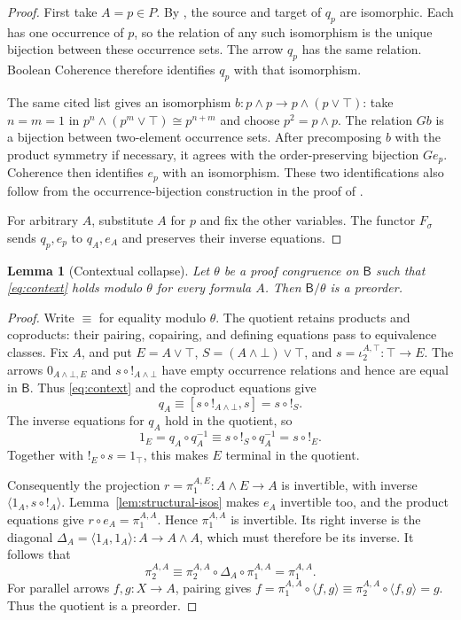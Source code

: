\documentclass[11pt]{article}
\newtheorem{lemma}[theorem]{Lemma}
\newcommand{\B}{\mathsf B}
\begin{document}
\begin{proof}
First take $A=p\in P$. By \cite[\S12.5, p.~294]{DP}, the source
and target of $q_p$ are isomorphic. Each has one occurrence of $p$,
so the relation of any such isomorphism is the unique bijection
between these occurrence sets. The arrow $q_p$ has the same relation.
Boolean Coherence therefore identifies $q_p$ with that isomorphism.

The same cited list gives an isomorphism
$b:p\wedge p\to p\wedge(p\vee\top)$: take $n=m=1$ in
$p^n\wedge(p^m\vee\top)\cong p^{n+m}$ and choose $p^2=p\wedge p$.
The relation $Gb$ is a bijection between two-element occurrence sets.
After precomposing $b$ with the product symmetry if necessary, it
agrees with the order-preserving bijection $Ge_p$. Coherence then
identifies $e_p$ with an isomorphism. These two identifications also
follow from the occurrence-bijection construction in the proof of
\cite[Lemma~7]{DPIsomorphic}.

For arbitrary $A$, substitute $A$ for $p$ and fix the other variables.
The functor $F_\sigma$ sends $q_p,e_p$ to $q_A,e_A$ and preserves
their inverse equations.
\end{proof}

\begin{lemma}[Contextual collapse]\label{lem:collapse}
Let $\theta$ be a proof congruence on $\B$ such that
\eqref{eq:context} holds modulo $\theta$ for every formula $A$.
Then $\B/\theta$ is a preorder.
\end{lemma}

\begin{proof}
Write $\equiv$ for equality modulo $\theta$.
The quotient retains products and coproducts: their pairing,
copairing, and defining equations pass to equivalence classes.
Fix $A$, and put
$E=A\vee\top$, $S=(A\wedge\bot)\vee\top$, and
$s=\iota_2^{A,\top}:\top\to E$.
The arrows $0_{A\wedge\bot,E}$ and $s\circ!_{A\wedge\bot}$ have
empty occurrence relations and hence are equal in $\B$. Thus
\eqref{eq:context} and the coproduct equations give
\[
 q_A\equiv[s\circ!_{A\wedge\bot},s]=s\circ!_S.
\]
The inverse equations for $q_A$ hold in the quotient, so
\[
 1_E=q_A\circ q_A^{-1}
    \equiv s\circ!_S\circ q_A^{-1}=s\circ!_E.
\]
Together with $!_E\circ s=1_\top$, this makes $E$ terminal in the
quotient.

Consequently the projection
$r=\pi_1^{A,E}:A\wedge E\to A$ is invertible, with inverse
$\langle1_A,s\circ!_A\rangle$.
Lemma~\ref{lem:structural-isos} makes $e_A$ invertible too, and the
product equations give
$r\circ e_A=\pi_1^{A,A}$.
Hence $\pi_1^{A,A}$ is invertible. Its right inverse is the diagonal
$\Delta_A=\langle1_A,1_A\rangle:A\to A\wedge A$, which must
therefore be its inverse. It follows that
\[
 \pi_2^{A,A}
   \equiv\pi_2^{A,A}\circ\Delta_A\circ\pi_1^{A,A}
   =\pi_1^{A,A}.
\]
For parallel arrows $f,g:X\to A$, pairing gives
$f=\pi_1^{A,A}\circ\langle f,g\rangle
 \equiv\pi_2^{A,A}\circ\langle f,g\rangle=g$.
Thus the quotient is a preorder.
\end{proof}
\end{document}
